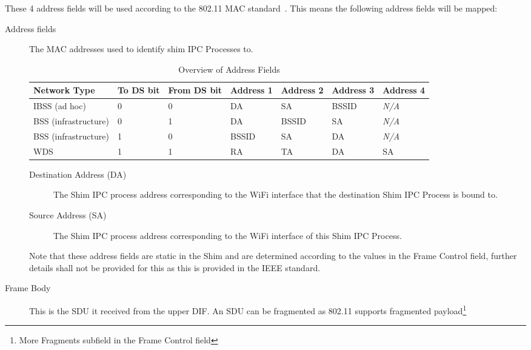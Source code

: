 These 4 address fields will be used according to the 802.11 MAC standard~\citep{ieee80211std}. This means the following address fields will be mapped:

\begin{description}

\item[Address fields] The MAC addresses used to identify shim IPC Processes to.
\\


\begin{table}[H]
	\begin{center}
		\begin{tabulary}{1.0\textwidth}{|L|L|L|L|L|L|L|}
			\hline
				\textbf{Network Type} & \textbf{To DS bit} & \textbf{From DS bit} & \nohyphens{\textbf{Address 1}} & \nohyphens{\textbf{Address 2}} & \nohyphens{\textbf{Address 3}} & \nohyphens{\textbf{Address 4}} \\ \hline
				IBSS (ad hoc) & 0 & 0 & DA & SA & BSSID & \emph{N/A} \\ \hline
				BSS (infrastructure) & 0 & 1 & DA & BSSID & SA & \emph{N/A} \\ \hline
				BSS (infrastructure) & 1 & 0 & BSSID & SA & DA & \emph{N/A} \\ \hline
				WDS & 1 & 1 & RA & TA & DA & SA \\
			\hline
		\end{tabulary}
		\caption[Overview of Address Fields]{Overview of Address Fields\protect\footnotemark}
	\end{center}
\end{table}


\begin{description}
	\item[Destination Address (DA)] The Shim IPC process address corresponding to the WiFi interface that the destination Shim IPC Process is bound to.
	\item[Source Address (SA)] The Shim IPC process address corresponding to the WiFi interface of this Shim IPC Process.
\end{description}

Note that these address fields are static in the Shim and are determined according to the values in the Frame Control field, further details shall not be provided for this as this is provided in the IEEE standard\citep{ieee80211std}.  

\item[Frame Body] This is the SDU it received from the upper DIF. An SDU can be fragmented as 802.11 supports fragmented payload\footnote{More Fragments subfield in the Frame Control field}

\end{description} 

